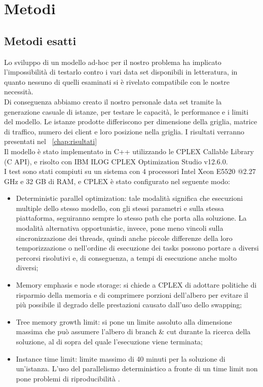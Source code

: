  \chapter{Metodi} \label{cap:metodi}

\ifpdf
    \graphicspath{{Chapter6/Figs/Raster/}{Chapter6/Figs/PDF/}{Chapter6/Figs/}}
\else
    \graphicspath{{Chapter6/Figs/Vector/}{Chapter6/Figs/}}
\fi

\section{Metodi esatti}
Lo sviluppo di un modello ad-hoc per il nostro problema ha implicato l'impossibilità di testarlo contro i vari data set disponibili in letteratura, in quanto nessuno di quelli esaminati si è rivelato compatibile con le nostre necessità. \\
Di conseguenza abbiamo creato il nostro personale data set tramite la generazione casuale di istanze, per testare le capacità, le performance e i limiti del modello. Le istanze prodotte differiscono per dimensione della griglia, matrice di traffico, numero dei client e loro posizione nella griglia. I risultati verranno presentati nel \chaptername\ \ref{chap:risultati} \\
Il modello è stato implementato in C++ utilizzando le CPLEX Callable Library (C API), e risolto con IBM ILOG CPLEX Optimization Studio v12.6.0. \\
I test sono stati compiuti su un sistema con 4 processori Intel Xeon E5520 @2.27 GHz e 32 GB di RAM, e CPLEX è stato configurato nel seguente modo:
\begin{itemize}
	\item Deterministic parallel optimization: tale modalità significa che esecuzioni multiple dello stesso modello, con gli stessi parametri e sulla stessa piattaforma, seguiranno sempre lo stesso path che porta alla soluzione. La modalità alternativa opportunistic, invece, pone meno vincoli sulla sincronizzazione dei threads, quindi anche piccole differenze della loro temporizzazione o nell'ordine di esecuzione dei tasks possono portare a diversi percorsi risolutivi e, di conseguenza, a tempi di esecuzione anche molto diversi; 
	\item Memory emphasis e node storage: si chiede a CPLEX di adottare politiche di risparmio della memoria e di comprimere  porzioni dell'albero per evitare il più possibile il degrado delle prestazioni causato dall'uso dello swapping;  
	\item Tree memory growth limit: si pone un limite assoluto alla dimensione massima che può assumere l'albero di branch \& cut durante la ricerca della soluzione, al di sopra del quale l'esecuzione viene terminata;
	\item Instance time limit: limite massimo di 40 minuti per la soluzione di un'istanza. L'uso del parallelismo deterministico a fronte di un time limit non pone problemi di riproducibilità \cite{cplex2015man} .
\end{itemize} 
